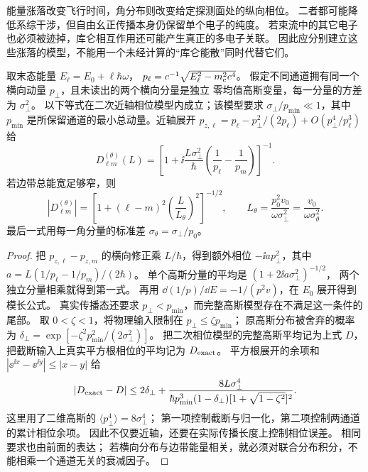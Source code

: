 能量涨落改变飞行时间，角分布则改变给定探测面处的纵向相位。
二者都可能降低系综干涉，但自由幺正传播本身仍保留单个电子的纯度。
若束流中的其它电子也必须被迹掉，库仑相互作用还可能产生真正的多电子关联。
因此应分别建立这些涨落的模型，不能用一个未经计算的“库仑能散”同时代替它们。

\begin{proposition}[固定探测面上的近轴角平均]
取末态能量 $E_\ell=E_0+\ell\hbar\omega$，
$p_\ell=c^{-1}\sqrt{E_\ell^2-m_{\rm e}^2c^4}$。
假定不同通道拥有同一个横向动量 $p_\perp$，且未读出的两个横向分量是独立
零均值高斯变量，每一分量的方差为 $\sigma_\perp^2$。
以下等式在二次近轴相位模型内成立；该模型要求 $\sigma_\perp/p_{\min}\ll1$，其中 $p_{\min}$ 是所保留通道的最小总动量。近轴展开 $p_{z,\ell}=p_\ell-p_\perp^2/(2p_\ell)+O(p_\perp^4/p_\ell^3)$ 给
\begin{equation}
D_{\ell m}^{(\theta)}(L)=
\left[1+\ii\frac{L\sigma_\perp^2}{\hbar}
\left(\frac1{p_\ell}-\frac1{p_m}\right)\right]^{-1}.
\label{eq:feqo-angular-damping}
\end{equation}
若边带总能宽足够窄，则
\begin{equation}
|D_{\ell m}^{(\theta)}|=
\left[1+(\ell-m)^2\left(\frac{L}{L_\theta}\right)^2\right]^{-1/2},
\qquad L_\theta=\frac{p_0^2v_0}{\omega\sigma_\perp^2}
=\frac{v_0}{\omega\sigma_\theta^2}.
\label{eq:feqo-Ltheta-def}
\end{equation}
最后一式用每一角分量的标准差 $\sigma_\theta=\sigma_\perp/p_0$。
\end{proposition}
\begin{proof}
把 $p_{z,\ell}-p_{z,m}$ 的横向修正乘 $L/\hbar$，得到额外相位
$-\ii a p_\perp^2$，其中 $a=L(1/p_\ell-1/p_m)/(2\hbar)$。
单个高斯分量的平均是 $(1+2\ii a\sigma_\perp^2)^{-1/2}$，
两个独立分量相乘就得到第一式。
再用
$\dd(1/p)/\dd E=-1/(p^2v)$，在 $E_0$ 展开得到模长公式。
真实传播态还要求 $p_\perp<p_{\min}$，而完整高斯模型存在不满足这一条件的尾部。
取 $0<\zeta<1$，将物理输入限制在 $p_\perp\le\zeta p_{\min}$；
原高斯分布被舍弃的概率为 $\delta_\perp=\exp[-\zeta^2p_{\min}^2/(2\sigma_\perp^2)]$。
把二次相位模型的完整高斯平均记为上式 $D$，把截断输入上真实平方根相位的平均记为 $D_{\rm exact}$。
平方根展开的余项和 $|\ee^{\ii x}-\ee^{\ii y}|\le|x-y|$ 给
\[
 |D_{\rm exact}-D|
 \le2\delta_\perp+
 \frac{8L\sigma_\perp^4}{\hbar p_{\min}^3(1-\delta_\perp)
 [1+\sqrt{1-\zeta^2}]^2}.
\]
这里用了二维高斯的 $\langle p_\perp^4\rangle=8\sigma_\perp^4$；
第一项控制截断与归一化，第二项控制两通道的累计相位余项。
因此不仅要近轴，还要在实际传播长度上控制相位误差。
相同要求也由前面的表达；
若横向分布与边带能量相关，就必须对联合分布积分，不能相乘一个通道无关的衰减因子。
\end{proof}

